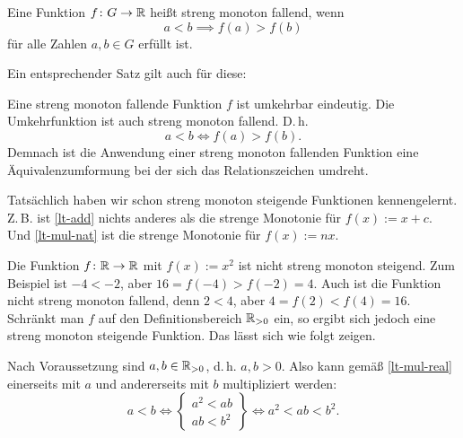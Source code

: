 \begin{Definition}
Eine Funktion $f\colon G\to\mathbb R$ heißt streng monoton fallend, wenn
\[a<b\implies f(a)>f(b)\]
für alle Zahlen $a,b\in G$ erfüllt ist.
\end{Definition}

\noindent
Ein entsprechender Satz gilt auch für diese:
\begin{Satz}
Eine streng monoton fallende Funktion $f$ ist umkehrbar eindeutig.
Die Umkehrfunktion ist auch streng monoton fallend. D.\,h.
\[a<b\iff f(a)>f(b).\]
Demnach ist die Anwendung einer streng monoton fallenden
Funktion eine Äquivalenzumformung bei der sich das Relationszeichen
umdreht.
\end{Satz}

\noindent
Tatsächlich haben wir schon streng monoton steigende Funktionen
kennengelernt. Z.\,B. ist \eqref{lt-add} nichts anderes als die strenge
Monotonie für $f(x):=x+c$. Und \eqref{lt-mul-nat} ist die strenge
Monotonie für $f(x):=nx$.

Die Funktion $f\colon\mathbb R\to\mathbb R$ mit $f(x):=x^2$ ist nicht streng monoton
steigend. Zum Beispiel ist $-4<-2$, aber $16=f(-4)>f(-2)=4$. Auch
ist die Funktion nicht streng monoton fallend, denn $2<4$,
aber $4=f(2)<f(4)=16$. Schränkt man $f$
auf den Definitionsbereich $\mathbb R_{>0}$ ein, so ergibt sich jedoch eine
streng monoton steigende Funktion. Das lässt sich wie folgt zeigen.

Nach Voraussetzung sind $a,b\in\mathbb R_{>0}$, d.\,h. $a,b>0$.
Also kann gemäß \eqref{lt-mul-real} einerseits mit $a$
und andererseits mit $b$ multipliziert werden:
\[
a<b\iff\begin{Bmatrix}
a^2<ab\\
ab<b^2
\end{Bmatrix}
\iff a^2<ab<b^2.
\]




